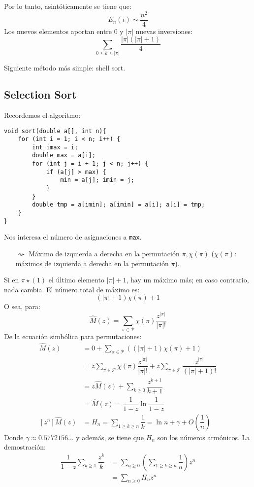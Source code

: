 \documentclass[english, spanish, fleqn, 10pt]{article}
\numberwithin{equation}{section}
\newcommand{\nparentesis}[1]{\left( #1 \right)}
\newcommand{\nabsoluto}[1]{\left| #1 \right|}
\newcommand{\ncorchetes}[1]{\left[ #1 \right]}
\theoremstyle{definition}
\begin{document}
Por lo tanto, asintóticamente se tiene que:
\begin{equation}
E_n\nparentesis{\iota} \sim \dfrac{n^2}{4}
\end{equation}
Los nuevos elementos aportan entre $0$ y $\nabsoluto{\pi}$ nuevas inversiones:
\begin{equation*}
\sum_{0 \leq k \leq \nabsoluto{\pi}} \dfrac{\nabsoluto{\pi}\nparentesis{\nabsoluto{\pi}+1}}{4}
\end{equation*}


Siguiente método más simple: shell sort.

\subsection{Selection Sort}
Recordemos el algoritmo:
\begin{lstlisting}
void sort(double a[], int n){
	for (int i = 1; i < n; i++) {
		int imax = i;
		double max = a[i];
		for (int j = i + 1; j < n; j++) {
			if (a[j] > max) {
				min = a[j]; imin = j;
			}
		}
		double tmp = a[imin]; a[imin] = a[i]; a[i] = tmp;
	}
}
\end{lstlisting}
Nos interesa el número de asignaciones a \texttt{max}.
\begin{itemize}
	\item [$\rightsquigarrow$] Máximo de izquierda a derecha en la permutación $\pi, \chi \nparentesis{\pi}$ ($\chi\nparentesis{\pi}$: máximos de izquierda a derecha en la permutación $\pi$).
\end{itemize}
Si en $\pi \star \nparentesis{1}$ el último elemento $\nabsoluto{\pi} + 1$, hay un máximo más; en caso contrario, nada cambia. El número total de máximo es:
\begin{equation*}
\nparentesis{\nabsoluto{\pi} + 1} \chi \nparentesis{\pi} + 1
\end{equation*}
O sea, para:
\begin{equation*}
\hat M \nparentesis{z} = \sum_{\pi \in \mathcal{P}}\chi \nparentesis{\pi} \dfrac{z^{\nabsoluto{\pi}}}{\nabsoluto{\pi}!}
\end{equation*}
De la ecuación simbólica para permutaciones:
\begin{align*}
\hat M \nparentesis{z} &= 0 + \sum_{\pi \in \mathcal{P}}\nparentesis{\nparentesis{\nabsoluto{\pi} + 1} \chi \nparentesis{\pi} + 1}\\
&= z\sum_{\pi \in \mathcal{P}}\chi \nparentesis{\pi}\dfrac{z^{\nabsoluto{\pi}}}{\nabsoluto{\pi}!} + z\sum_{\pi \in \mathcal{P}}\dfrac{z^{\nabsoluto{\pi}}}{\nparentesis{\nabsoluto{\pi} + 1}!}\\
&=z\hat M \nparentesis{z} + \sum_{k \geq 0} \dfrac{z^{k+1}}{k+1}\\
&=\hat M\nparentesis{z}= \dfrac{1}{1-z}\ln\dfrac{1}{1-z}\\
\ncorchetes{z^n}\hat M \nparentesis{z} &= H_n = \sum_{1 \geq k \geq n}\dfrac{1}{k} = \ln n + \gamma + O \nparentesis{\dfrac{1}{n}}
\end{align*}
Donde $\gamma \approx 0.5772156\ldots $ y además, se tiene que $H_n$ son los números armónicos. La demostración:
\begin{align*}
\dfrac{1}{1-z}\sum_{k\geq 1} \dfrac{z^k}{k} &= \sum_{n \geq 0}\nparentesis{\sum_{1\geq k \geq n}\dfrac{1}{n}}z^n\\
&= \sum_{n \geq 0} H_n z^n
\end{align*}
\end{document}

